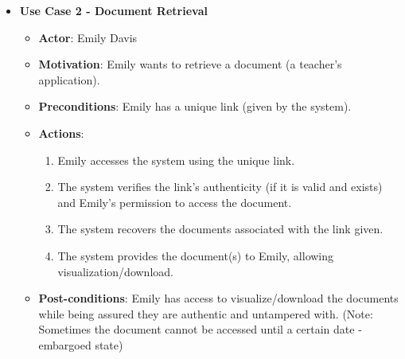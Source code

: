 \documentclass[a4paper,11pt]{article}
\begin{document}
\begin{itemize}
                    \pagebreak
                    \item \textbf{Use Case 2 - Document Retrieval}
                    \begin{itemize}
                        \item \textbf{Actor}: Emily Davis
                        \item \textbf{Motivation}: Emily wants to retrieve a document (a teacher's application).
                        \item \textbf{Preconditions}: Emily has a unique link (given by the system).
                        \item \textbf{Actions}:
                        \begin{enumerate}
                            \item Emily accesses the system using the unique link.
                            \item The system verifies the link's authenticity (if it is valid and exists) and Emily's permission to access the document.
                            \item The system recovers the documents associated with the link given.
                            \item The system provides the document(s) to Emily, allowing visualization/download.
                        \end{enumerate}
                        \item \textbf{Post-conditions}: Emily has access to visualize/download the documents while being assured they are authentic and untampered with. (Note: Sometimes the document cannot be accessed until a certain date - embargoed state)
                    \end{itemize}
                    

\end{itemize}
\end{document}
